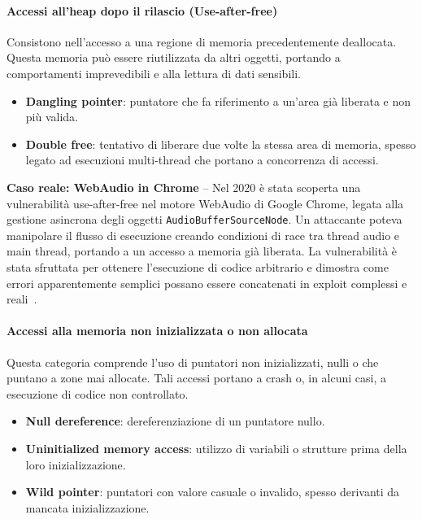   \paragraph{Accessi all'heap dopo il rilascio (Use-after-free)}
  \label{sec:uaf}

  Consistono nell'accesso a una regione di memoria precedentemente deallocata. Questa
  memoria può essere riutilizzata da altri oggetti, portando a comportamenti
  imprevedibili e alla lettura di dati sensibili.

  \begin{itemize}
    \item \textbf{Dangling pointer}: puntatore che fa riferimento a un'area già liberata
      e non più valida.

    \item \textbf{Double free}: tentativo di liberare due volte la stessa area di memoria,
      spesso legato ad esecuzioni multi-thread che portano a concorrenza di accessi.
  \end{itemize}

  \textbf{Caso reale: WebAudio in Chrome} -- Nel 2020 è stata scoperta una vulnerabilità
  use-after-free nel motore WebAudio di Google Chrome, legata alla gestione
  asincrona degli oggetti \texttt{AudioBufferSourceNode}. Un attaccante poteva
  manipolare il flusso di esecuzione creando condizioni di race tra thread audio e
  main thread, portando a un accesso a memoria già liberata. La vulnerabilità è
  stata sfruttata per ottenere l'esecuzione di codice arbitrario e dimostra come
  errori apparentemente semplici possano essere concatenati in exploit complessi e
  reali~\cite{webaudio_uaf}.

  \paragraph{Accessi alla memoria non inizializzata o non allocata}
  \label{sec:invalid_access}

  Questa categoria comprende l'uso di puntatori non inizializzati, nulli o che puntano
  a zone mai allocate. Tali accessi portano a crash o, in alcuni casi, a
  esecuzione di codice non controllato.

  \begin{itemize}
    \item \textbf{Null dereference}: dereferenziazione di un puntatore nullo.

    \item \textbf{Uninitialized memory access}: utilizzo di variabili o strutture prima
      della loro inizializzazione.

    \item \textbf{Wild pointer}: puntatori con valore casuale o invalido, spesso
      derivanti da mancata inizializzazione.
  \end{itemize}


